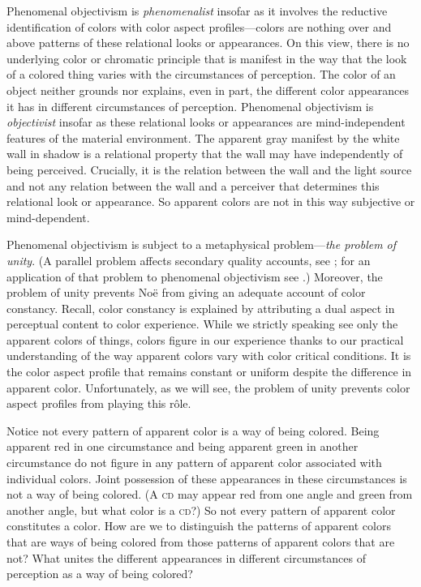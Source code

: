 \documentclass[12pt]{article}
\begin{document}
Phenomenal objectivism is \emph{phenomenalist} insofar as it involves the reductive identification of colors with color aspect profiles---colors are nothing over and above patterns of these relational looks or appearances. On this view, there is no underlying color or chromatic principle that is manifest in the way that the look of a colored thing varies with the circumstances of perception. The color of an object neither grounds nor explains, even in part, the different color appearances it has in different circumstances of perception. Phenomenal objectivism is \emph{objectivist} insofar as these relational looks or appearances are mind-independent features of the material environment. The apparent gray manifest by the white wall in shadow is a relational property that the wall may have independently of being perceived. Crucially, it is the relation between the wall and the light source and not any relation between the wall and a perceiver that determines this relational look or appearance. So apparent colors are not in this way subjective or mind-dependent.

Phenomenal objectivism is subject to a metaphysical problem---\emph{the problem of unity}. (A parallel problem affects secondary quality accounts, see \citealt{Kalderon:2006fk}; for an application of that problem to phenomenal objectivism see \citealt{Allen:2008kx}.) Moreover, the problem of unity prevents Noë from giving an adequate account of color constancy. Recall, color constancy is explained by attributing a dual aspect in perceptual content to color experience. While we strictly speaking see only the apparent colors of things, colors figure in our experience thanks to our practical understanding of the way apparent colors vary with color critical conditions. It is the color aspect profile that remains constant or uniform despite the difference in apparent color. Unfortunately, as we will see, the problem of unity prevents color aspect profiles from playing this rôle.

Notice not every pattern of apparent color is a way of being colored. Being apparent red in one circumstance and being apparent green in another circumstance do not figure in any pattern of apparent color associated with individual colors. Joint possession of these appearances in these circumstances is not a way of being colored. (A \textsc{cd} may appear red from one angle and green from another angle, but what color is a \textsc{cd}?) So not every pattern of apparent color constitutes a color. How are we to distinguish the patterns of apparent colors that are ways of being colored from those patterns of apparent colors that are not? What unites the different appearances in different circumstances of perception as a way of being colored?
\end{document}
